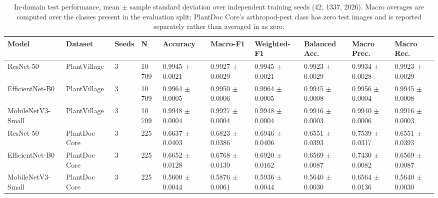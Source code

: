 \begin{table}[htbp]
\caption{In-domain test performance, mean $\pm$ sample standard deviation over independent training seeds (42, 1337, 2026). Macro averages are computed over the classes present in the evaluation split; PlantDoc Core's arthropod-pest class has zero test images and is reported separately rather than averaged in as zero.}
\label{tab:in-domain}
\tiny
\centering
\setlength{\tabcolsep}{4pt}
\begin{tabular}{llllllllll}
\toprule
Model & Dataset & Seeds & N & Accuracy & Macro-F1 & Weighted-F1 & Balanced Acc. & Macro Prec. & Macro Rec. \\
\midrule
ResNet-50 & PlantVillage & 3 & 10\,709 & 0.9945 $\pm$ 0.0021 & 0.9927 $\pm$ 0.0029 & 0.9945 $\pm$ 0.0021 & 0.9923 $\pm$ 0.0029 & 0.9934 $\pm$ 0.0028 & 0.9923 $\pm$ 0.0029 \\
EfficientNet-B0 & PlantVillage & 3 & 10\,709 & 0.9964 $\pm$ 0.0005 & 0.9950 $\pm$ 0.0006 & 0.9964 $\pm$ 0.0005 & 0.9945 $\pm$ 0.0008 & 0.9956 $\pm$ 0.0004 & 0.9945 $\pm$ 0.0008 \\
MobileNetV3-Small & PlantVillage & 3 & 10\,709 & 0.9948 $\pm$ 0.0004 & 0.9927 $\pm$ 0.0004 & 0.9948 $\pm$ 0.0004 & 0.9916 $\pm$ 0.0003 & 0.9940 $\pm$ 0.0006 & 0.9916 $\pm$ 0.0003 \\
ResNet-50 & PlantDoc Core & 3 & 225 & 0.6637 $\pm$ 0.0403 & 0.6823 $\pm$ 0.0386 & 0.6946 $\pm$ 0.0406 & 0.6551 $\pm$ 0.0393 & 0.7539 $\pm$ 0.0317 & 0.6551 $\pm$ 0.0393 \\
EfficientNet-B0 & PlantDoc Core & 3 & 225 & 0.6652 $\pm$ 0.0128 & 0.6768 $\pm$ 0.0139 & 0.6920 $\pm$ 0.0162 & 0.6569 $\pm$ 0.0087 & 0.7430 $\pm$ 0.0082 & 0.6569 $\pm$ 0.0087 \\
MobileNetV3-Small & PlantDoc Core & 3 & 225 & 0.5600 $\pm$ 0.0044 & 0.5876 $\pm$ 0.0061 & 0.5936 $\pm$ 0.0044 & 0.5640 $\pm$ 0.0030 & 0.6564 $\pm$ 0.0136 & 0.5640 $\pm$ 0.0030 \\
\bottomrule
\end{tabular}
\end{table}
